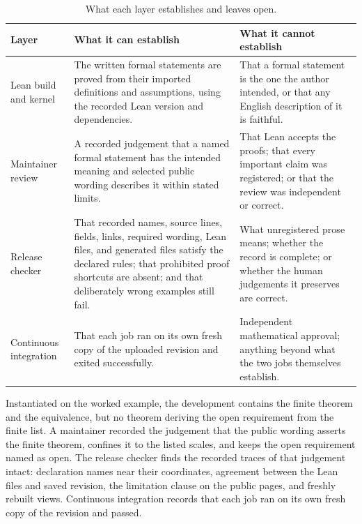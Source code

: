 \documentclass[11pt]{article}
\begin{document}
\begin{table}[t]
\centering\small
\begin{tabular}{@{}>{\raggedright\arraybackslash}p{}
                    >{\raggedright\arraybackslash}p{}
                    >{\raggedright\arraybackslash}p{}@{}}
\toprule
Layer & What it can establish & What it cannot establish \\
\midrule
Lean build and kernel
& The written formal statements are proved from their imported definitions
  and assumptions, using the recorded Lean version and dependencies.
& That a formal statement is the one the author intended, or that any English
  description of it is faithful. \\
\addlinespace
Maintainer review
& A recorded judgement that a named formal statement has the intended meaning
  and selected public wording describes it within stated limits.
& That Lean accepts the proofs; that every important claim was registered; or
  that the review was independent or correct. \\
\addlinespace
Release checker
& That recorded names, source lines, fields, links, required wording, Lean
  files, and generated files satisfy the declared rules; that prohibited proof
  shortcuts are absent; and that deliberately wrong examples still fail.
& What unregistered prose means; whether the record is complete; or whether
  the human judgements it preserves are correct. \\
\addlinespace
Continuous integration
& That each job ran on its own fresh copy of the uploaded revision and exited
  successfully.
& Independent mathematical approval; anything beyond what the two jobs
  themselves establish. \\
\bottomrule
\end{tabular}
\caption{What each layer establishes and leaves open.}
\label{tab:trust}
\end{table}

Instantiated on the worked example, the development contains the finite theorem and the
equivalence, but no theorem deriving the open requirement from the finite list.
A maintainer recorded the judgement that the public wording
asserts the finite theorem, confines it to the listed scales, and keeps the
open requirement named as open.  The release checker finds the recorded traces
of that judgement intact: declaration names near their coordinates, agreement
between the Lean files and saved revision, the limitation clause on the public pages, and freshly
rebuilt views.  Continuous integration records that each job ran on its own
fresh copy of the revision and passed.
\end{document}
